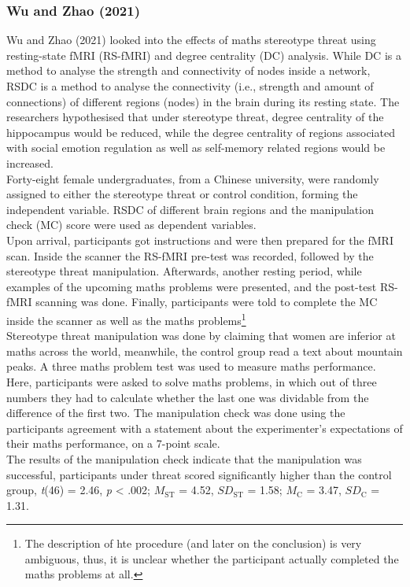 \documentclass[
  stu,floatsintext]{apa7}
\begin{document}
\subsubsection{Wu and Zhao (2021)}\label{wudegreecentralitybrain2021}

Wu and Zhao (2021) looked into the effects of maths stereotype threat using resting-state fMRI (RS-fMRI) and degree centrality (DC) analysis.
While DC is a method to analyse the strength and connectivity of nodes inside a network, RSDC is a method to analyse the connectivity (i.e., strength and amount of connections) of different regions (nodes) in the brain during its resting state.
The researchers hypothesised that under stereotype threat, degree centrality of the hippocampus would be reduced, while the degree centrality of regions associated with social emotion regulation as well as self-memory related regions would be increased.\\
Forty-eight female undergraduates, from a Chinese university, were randomly assigned to either the stereotype threat or control condition, forming the independent variable.
RSDC of different brain regions and the manipulation check (MC) score were used as dependent variables.\\
Upon arrival, participants got instructions and were then prepared for the fMRI scan.
Inside the scanner the RS-fMRI pre-test was recorded, followed by the stereotype threat manipulation.
Afterwards, another resting period, while examples of the upcoming maths problems were presented, and the post-test RS-fMRI scanning was done.
Finally, participants were told to complete the MC inside the scanner as well as the maths problems\footnote{The description of hte procedure (and later on the conclusion) is very ambiguous, thus, it is unclear whether the participant actually completed the maths problems at all.}\\
Stereotype threat manipulation was done by claiming that women are inferior at maths across the world, meanwhile, the control group read a text about mountain peaks.
A three maths problem test was used to measure maths performance.
Here, participants were asked to solve maths problems, in which out of three numbers they had to calculate whether the last one was dividable from the difference of the first two.
The manipulation check was done using the participants agreement with a statement about the experimenter's expectations of their maths performance, on a 7-point scale.\\
The results of the manipulation check indicate that the manipulation was successful, participants under threat scored significantly higher than the control group, \emph{t}(46) = 2.46, \emph{p} \textless{} .002; \(M_{\text{ST}}\) = 4.52, \(SD_{\text{ST}}\) = 1.58; \(M_{\text{C}}\) = 3.47, \(SD_{\text{C}}\) = 1.31.
\end{document}
